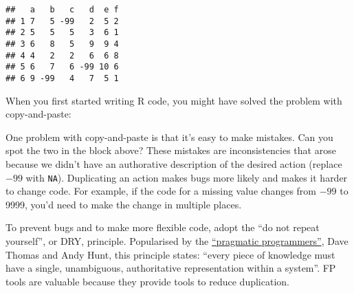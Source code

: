\begin{verbatim}
##   a   b   c   d  e f
## 1 7   5 -99   2  5 2
## 2 5   5   5   3  6 1
## 3 6   8   5   9  9 4
## 4 4   2   2   6  6 8
## 5 6   7   6 -99 10 6
## 6 9 -99   4   7  5 1
\end{verbatim}

When you first started writing R code, you might have solved the problem
with copy-and-paste:

\begin{Shaded}
\begin{Highlighting}[]
\OperatorTok{$}\NormalTok{a[df}\OperatorTok{$}\OperatorTok{==}\StringTok{ }\NormalTok{] <-}\StringTok{ }
\OperatorTok{$}\NormalTok{b[df}\OperatorTok{$}\OperatorTok{==}\StringTok{ }\NormalTok{] <-}\StringTok{ }
\OperatorTok{$}\NormalTok{c[df}\OperatorTok{$}\OperatorTok{==}\StringTok{ }\NormalTok{] <-}\StringTok{ }
\OperatorTok{$}\NormalTok{d[df}\OperatorTok{$}\OperatorTok{==}\StringTok{ }\NormalTok{] <-}\StringTok{ }
\OperatorTok{$}\NormalTok{e[df}\OperatorTok{$}\OperatorTok{==}\StringTok{ }\NormalTok{] <-}\StringTok{ }
\OperatorTok{$}\NormalTok{f[df}\OperatorTok{$}\OperatorTok{==}\StringTok{ }\NormalTok{] <-}\StringTok{ }
\end{Highlighting}
\end{Shaded}

One problem with copy-and-paste is that it's easy to make mistakes. Can
you spot the two in the block above? These mistakes are inconsistencies
that arose because we didn't have an authorative description of the
desired action (replace \(-99\) with \texttt{NA}). Duplicating an action
makes bugs more likely and makes it harder to change code. For example,
if the code for a missing value changes from \(-99\) to 9999, you'd need
to make the change in multiple places.

To prevent bugs and to make more flexible code, adopt the ``do not
repeat yourself'', or DRY, principle. Popularised by the
\href{http://pragprog.com/about}{``pragmatic programmers''}, Dave Thomas
and Andy Hunt, this principle states: ``every piece of knowledge must
have a single, unambiguous, authoritative representation within a
system''. FP tools are valuable because they provide tools to reduce
duplication.

